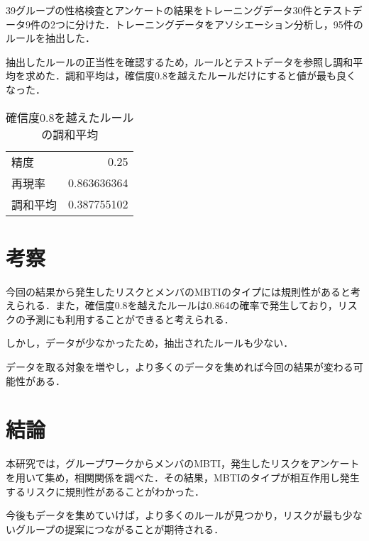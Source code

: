 \documentclass[uplatex,twocolumn,dvipdfmx]{jsarticle}
\begin{document}
39グループの性格検査とアンケートの結果をトレーニングデータ30件とテストデータ9件の2つに分けた．トレーニングデータをアソシエーション分析し，95件のルールを抽出した．

抽出したルールの正当性を確認するため，ルールとテストデータを参照し調和平均を求めた．調和平均は，確信度0.8を越えたルールだけにすると値が最も良くなった．
\renewcommand{\arraystretch}{0.75}
\begin{table}[htbp]
\centering
\caption{確信度0.8を越えたルールの調和平均}\label{調和平均算出結果}
\begin{tabular}{l|r}
\hline
精度 & 0.25\\
再現率 & 0.863636364\\
調和平均 & 0.387755102\\
\hline
\end{tabular}
\end{table}
\renewcommand{\arraystretch}{0.75}


\section{考察}
今回の結果から発生したリスクとメンバのMBTIのタイプには規則性があると考えられる．また，確信度0.8を越えたルールは0.864の確率で発生しており，リスクの予測にも利用することができると考えられる．

しかし，データが少なかったため，抽出されたルールも少ない．

データを取る対象を増やし，より多くのデータを集めれば今回の結果が変わる可能性がある．

\section{結論}
本研究では，グループワークからメンバのMBTI，発生したリスクをアンケートを用いて集め，相関関係を調べた．その結果，MBTIのタイプが相互作用し発生するリスクに規則性があることがわかった．

今後もデータを集めていけば，より多くのルールが見つかり，リスクが最も少ないグループの提案につながることが期待される．
\nocite{MBTI}
\nocite{110009915588}

\end{document}
